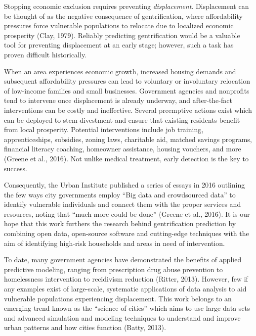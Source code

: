 \documentclass[12pt,]{article}
\begin{document}
Stopping economic exclusion requires preventing \emph{displacement}.
Displacement can be thought of as the negative consequence of
gentrification, where affordability pressures force vulnerable
populations to relocate due to localized economic prosperity (Clay,
1979). Reliably predicting gentrification would be a valuable tool for
preventing displacement at an early stage; however, such a task has
proven difficult historically.

When an area experiences economic growth, increased housing demands and
subsequent affordability pressures can lead to voluntary or involuntary
relocation of low-income families and small businesses. Government
agencies and nonprofits tend to intervene once displacement is already
underway, and after-the-fact interventions can be costly and
ineffective. Several preemptive actions exist which can be deployed to
stem divestment and ensure that existing residents benefit from local
prosperity. Potential interventions include job training,
apprenticeships, subsidies, zoning laws, charitable aid, matched savings
programs, financial literacy coaching, homeowner assistance, housing
vouchers, and more (Greene et al., 2016). Not unlike medical treatment,
early detection is the key to success.

Consequently, the Urban Institute published a series of essays in 2016
outlining the few ways city governments employ ``Big data and
crowdsourced data'' to identify vulnerable individuals and connect them
with the proper services and resources, noting that ``much more could be
done'' (Greene et al., 2016). It is our hope that this work furthers the
research behind gentrification prediction by combining open data,
open-source software and cutting-edge techniques with the aim of
identifying high-risk households and areas in need of intervention.

To date, many government agencies have demonstrated the benefits of
applied predictive modeling, ranging from prescription drug abuse
prevention to homelessness intervention to recidivism reduction (Ritter,
2013). However, few if any examples exist of large-scale, systematic
applications of data analysis to aid vulnerable populations experiencing
displacement. This work belongs to an emerging trend known as the
``science of cities'' which aims to use large data sets and advanced
simulation and modeling techniques to understand and improve urban
patterns and how cities function (Batty, 2013).
\end{document}
